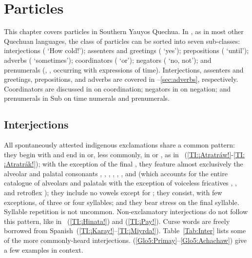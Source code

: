 \chapter{Particles}\label{ch:particles}
This chapter covers particles in Southern Yauyos Quechua. In \SYQ, as in most other Quechuan languages, the class of particles can be sorted into seven sub-classes: interjections ( ‘How cold!’); assenters and greetings ( ‘yes’); prepositions ( ‘until’); adverbs ( ‘sometimes’); coordinators ( ‘or’); negators ( ‘no, not’); and prenumerals (, , occurring with expressions of time). Interjections, assenters and greetings, prepositions, and adverbs are covered in --\ref{sec:adverbs}, respectively. Coordinators are discussed in  on coordination; negators in  on negation; and prenumerals in Sub  on time numerals and prenumerals.

\section{Interjections}\label{sec:interjections}
All spontaneously attested indigenous exclamations share a common pattern: they begin with  and end in  or, less commonly, in  or , as in ~(\ref{TI:¡Atratráw!}-\ref{TI:¡Atratrák!}); with the exception of the final , they feature almost exclusively the alveolar and palatal consonants , , , , , , and  (which accounts for the entire catalogue of \SYQ{} alveolars and palatals with the exception of voiceless fricatives , , and retroflex ); they include no vowels except for ; they consist, with few exceptions, of three or four syllables; and they bear stress on the final syllable. Syllable repetition is not uncommon. Non-exclamatory interjections do not follow this pattern, like in ~(\ref{TI:¡Hinata!}) and (\ref{TI:¡Pay!}). Curse words are freely borrowed from Spanish~(\ref{TI:¡Karay!}--\ref{TI:¡Miyrda!}). Table~\ref{Tab:Inter} lists some of the more commonly-heard interjections. (\ref{Glo5:Primay}--\ref{Glo5:Achachaw}) give a few examples in context.\\

